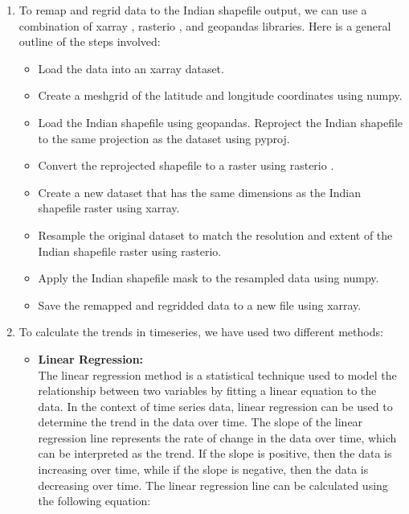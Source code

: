 \documentclass[a4paper, 12pt, twoside]{report}
\begin{document}
\begin{enumerate}
    \item To remap and regrid data to the Indian shapefile output, we can use a combination of {\selectfont xarray} ,  {\selectfont rasterio} , and  {\selectfont geopandas}  libraries. Here is a general outline of the steps involved:
          \begin{itemize}
              \item Load the data into an xarray dataset.
              \item Create a meshgrid of the latitude and longitude coordinates using {\selectfont numpy}.
              \item
                    Load the Indian shapefile using {\selectfont geopandas}.
                    Reproject the Indian shapefile to the same projection as the dataset using {\selectfont pyproj}.
              \item
                    Convert the reprojected shapefile to a raster using {\selectfont rasterio} .
              \item
                    Create a new dataset that has the same dimensions as the Indian shapefile raster using {\selectfont xarray}.
              \item
                    Resample the original dataset to match the resolution and extent of the Indian shapefile raster using {\selectfont rasterio}.
              \item
                    Apply the Indian shapefile mask to the resampled data using {\selectfont numpy}.
              \item
                    Save the remapped and regridded data to a new file using {\selectfont xarray}.
          \end{itemize}
    \item To calculate the trends in timeseries, we have used two different methods:
          \begin{itemize}
              \item \textbf{Linear Regression:} \\
                    The linear regression method is a statistical technique used to model the relationship between two variables by fitting a linear equation to the data. In the context of time series data, linear regression can be used to determine the trend in the data over time. The slope of the linear regression line represents the rate of change in the data over time, which can be interpreted as the trend. If the slope is positive, then the data is increasing over time, while if the slope is negative, then the data is decreasing over time. The linear regression line can be calculated using the following equation:


\end{itemize}
\end{enumerate}
\end{document}
